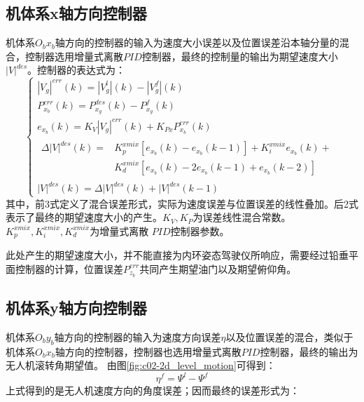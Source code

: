 \subsection{机体系x轴方向控制器}
机体系$O_bx_b$轴方向的控制器的输入为速度大小误差以及位置误差沿本轴分量的混合，控制器选用增量式离散$PID$控制器，最终的控制量的输出为期望速度大小${|V|}^{des}$。控制器的表达式为：
\begin{equation}
    \left\{
    \begin{array}{l}
        |V_g|^{err}(k)=|V_g^{l}|(k)-|V_g^{f}|(k)\\
        P_{x_b}^{err}(k)=P_{x_g}^{des}(k)-P_{x_g}^{f}(k)\\
        e_{x_b}(k)=K_V|V_g|^{err}(k)+K_{Px}P_{x_b}^{err}(k)\\
        \begin{aligned}
        \Delta{|V|}^{des}(k)=&K_{p}^{xmix}[e_{x_b}(k)-e_{x_b}(k-1)]+K_{i}^{xmix}e_{x_b}(k)+\\
        &K_{d}^{xmix}[e_{x_b}(k)-2e_{x_b}(k-1)+e_{x_b}(k-2)]
        \end{aligned}
        \\
        {|V|}^{des}(k)=\Delta{|V|}^{des}(k)+{|V|}^{des}(k-1)
    \end{array}
    \right .
    \label{xb_vel_gen_equ}
\end{equation}
其中，前3式定义了混合误差形式，实际为速度误差与位置误差的线性叠加。后2式表示了最终的期望速度大小的产生。$K_V,K_P$为误差线性混合常数。$K_{p}^{xmix},K_{i}^{xmix},K_{d}^{xmix}$为增量式离散
$PID$控制器参数。

此处产生的期望速度大小，并不能直接为内环姿态驾驶仪所响应，需要经过铅垂平面控制器的计算，位置误差$P_{z_b}^{err}$共同产生期望油门以及期望俯仰角。
\subsection{机体系y轴方向控制器}
机体系$O_by_b$轴方向的控制器的输入为速度方向误差$\eta$以及位置误差的混合，类似于机体系$O_bx_b$轴方向的控制器，控制器也选用增量式离散$PID$控制器，最终的输出为无人机滚转角期望值。
由图\ref{fig:c02-2d_level_motion}可得到：
\begin{equation}
    \eta^f=\Psi^l-\Psi^f
    \label{yaw_error}
\end{equation}
上式得到的是无人机速度方向的角度误差；因而最终的误差形式为：

